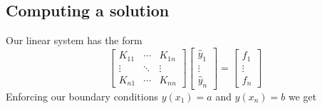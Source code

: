 \documentclass[acmtog]{acmart}
\begin{document}
\subsection{Computing a solution}
Our linear system has the form
%
\begin{equation}
  \begin{bmatrix}
    K_{11} & \cdots & K_{1n} \\
    \vdots & \ddots & \vdots \\
    K_{n1} & \cdots & K_{nn}
  \end{bmatrix}
  \begin{bmatrix}
    \hat{y}_1 \\
    \vdots    \\
    \hat{y}_n
  \end{bmatrix} = \begin{bmatrix}
    f_1    \\
    \vdots \\
    f_n
  \end{bmatrix}
\end{equation}
%
Enforcing our boundary conditions $y(x_1) = a$ and $y(x_n) = b$ we get
%
\end{document}
